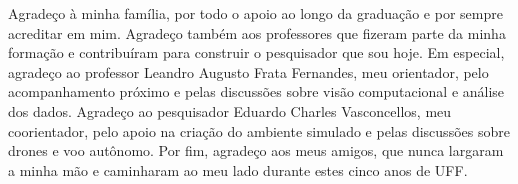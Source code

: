 \begin{agradecimentos}
Agradeço à minha família, por todo o apoio ao longo da graduação e por sempre acreditar em mim. Agradeço também aos professores que fizeram parte da minha formação e contribuíram para construir o pesquisador que sou hoje. Em especial, agradeço ao professor Leandro Augusto Frata Fernandes, meu orientador, pelo acompanhamento próximo e pelas discussões sobre visão computacional e análise dos dados. Agradeço ao pesquisador Eduardo Charles Vasconcellos, meu coorientador, pelo apoio na criação do ambiente simulado e pelas discussões sobre drones e voo autônomo. Por fim, agradeço aos meus amigos, que nunca largaram a minha mão e caminharam ao meu lado durante estes cinco anos de UFF.
\end{agradecimentos}
